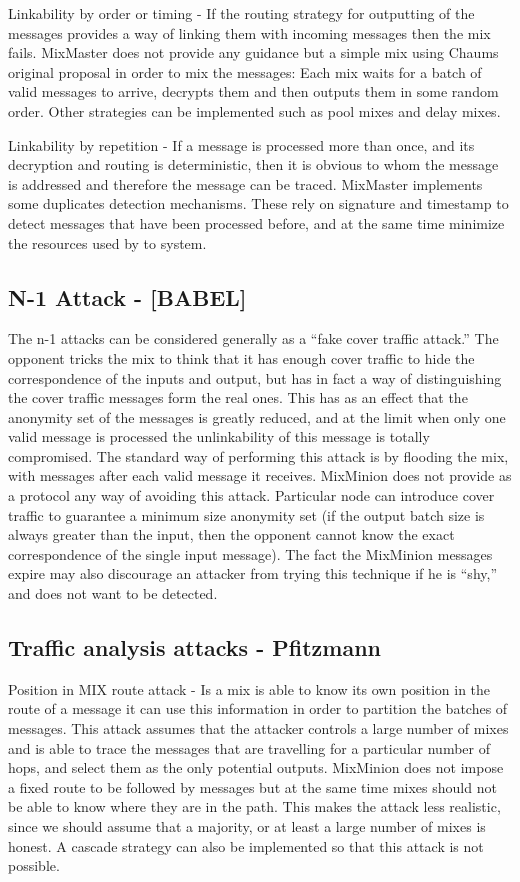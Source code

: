 \documentclass{article}
\begin{document}
Linkability by order or timing - If the routing strategy for
outputting of the messages provides a way of linking them with
incoming messages then the mix fails. MixMaster does not provide any
guidance but a simple mix using Chaums original proposal in order to
mix the messages: Each mix waits for a batch of valid messages to
arrive, decrypts them and then outputs them in some random
order. Other strategies can be implemented such as pool mixes and
delay mixes.

Linkability by repetition - If a message is processed more than once,
and its decryption and routing is deterministic, then it is obvious to
whom the message is addressed and therefore the message can be
traced. MixMaster implements some duplicates detection
mechanisms. These rely on signature and timestamp to
detect messages that have been processed before, and at the same time
minimize the resources used by to system.

\subsection{N-1 Attack - [BABEL]}

The n-1 attacks can be considered generally as a ``fake cover traffic
attack.'' The opponent tricks the mix to think that it has enough cover
traffic to hide the correspondence of the inputs and output, but has
in fact a way of distinguishing the cover traffic messages form the
real ones. This has as an effect that the anonymity set of the
messages is greatly reduced, and at the limit when only one valid
message is processed the unlinkability of this message is totally
compromised. The standard way of performing this attack is by flooding
the mix, with messages after each valid message it receives. MixMinion
does not provide as a protocol any way of avoiding this
attack. Particular node can introduce cover
traffic to guarantee a minimum size anonymity set (if the output batch
size is always greater than the input, then the opponent cannot know
the exact correspondence of the single input message). The fact the
MixMinion messages expire may also discourage an attacker from trying
this technique if he is ``shy,'' and does not want to be detected.

\subsection{Traffic analysis attacks - Pfitzmann}

Position in MIX route attack - Is a mix is able to know its own
position in the route of a message it can use this information in
order to partition the batches of messages. This attack assumes that
the attacker controls a large number of mixes and is able to trace the
messages that are travelling for a particular number of hops, and select
them as the only potential outputs. MixMinion does not impose a fixed
route to be followed by messages but at the same time mixes should not
be able to know where they are in the path. This makes the attack less
realistic, since we should assume that a majority, or at least a large
number of mixes is honest. A cascade strategy can also be implemented
so that this attack is not possible.
\end{document}
